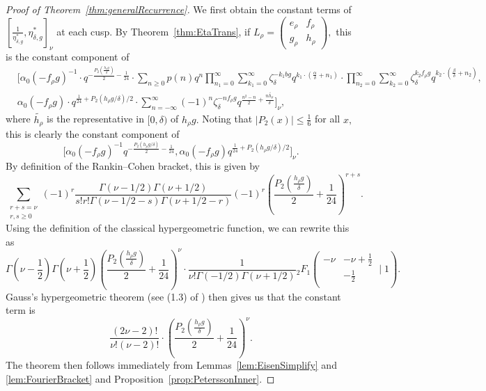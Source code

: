 \documentclass[10pt]{amsart}
\theoremstyle{definition}
\theoremstyle{remark}
\numberwithin{equation}{section}
\begin{document}
	\begin{proof}[Proof of Theorem~\ref{thm:generalRecurrence}]
		We first obtain the constant terms of $[\frac{1}{\eta_{\delta,g}^\ast},\eta_{\delta,g}^\ast]_\nu$ at each cusp. By Theorem~\ref{thm:EtaTrans}, if $L_\rho=\begin{pmatrix}
			e_\rho & f_\rho \\
			g_\rho & h_\rho
		\end{pmatrix},$ this is the constant component of
		\begin{align*}
			&\Bigg[\alpha_0(-f_\rho g)^{-1}\cdot q^{-\frac{P_2\left(\frac{h_\rho g}{\delta}\right)}{2}-\frac{1}{24}}\cdot\sum\limits_{n\geq 0}p(n)q^n\prod\limits_{n_1=0}^\infty\sum\limits_{k_1=0}^\infty\zeta_{\delta}^{-k_1bg}q^{k_1\cdot\left(\frac{\alpha}{\delta}+n_1\right)}\cdot \prod\limits_{n_2=0}^\infty\sum\limits_{k_2=0}^\infty\zeta_{\delta}^{k_2f_\rho g}q^{k_2\cdot\left(\frac{\beta}{\delta}+n_2\right)},\\ & \alpha_0(-f_\rho g)\cdot q^{\frac{1}{24}+P_2(h_\rho g/\delta)/2}\cdot\sum\limits_{n=-\infty}^{\infty} (-1)^n\zeta_\delta^{-nf_\rho g}q^{\frac{n^2-n}{2}+\frac{n\tilde{h_\rho}}{\delta}}\Bigg]_\nu,
		\end{align*} 
		where $\tilde{h_\rho}$ is the representative in $[0,\delta)$ of $h_\rho g.$ 
		Noting that $|P_2(x)|\leq\frac{1}{6}$ for all $x,$ this is clearly the constant component of
		$$
		\Bigg[\alpha_0(-f_\rho g)^{-1}q^{-\frac{P_2(h_\rho g/\delta)}{2}-\frac{1}{24}},\alpha_0(-f_\rho g)q^{\frac{1}{24}+P_2(h_\rho g/\delta)/2}\Bigg]_\nu.
		$$
		By definition of the Rankin--Cohen bracket, this is given by
			$$
		\sum\limits_{\substack{r+s=\nu \\ r,s\geq 0}}(-1)^r\frac{\Gamma(\nu-1/2)\Gamma(\nu+1/2)}{s!r!\Gamma(\nu-1/2-s)\Gamma(\nu+1/2-r)}(-1)^r \left(\frac{P_2\left(\frac{h_\rho g}{\delta}\right)}{2}+\frac{1}{24}\right)^{r+s}.
		$$
		Using the definition of the classical hypergeometric function, we can rewrite this as
	$$
	\Gamma(\nu-\frac{1}{2})\Gamma(\nu+\frac{1}{2})\left(\frac{P_2\left(\frac{h_\rho g}{\delta}\right)}{2}+\frac{1}{24}\right)^\nu\cdot \frac{1}{\nu!\Gamma(-1/2)\Gamma(\nu+1/2)}{_2F_1}\left(\begin{array}{cc}
		-\nu & -\nu+\frac{1}{2}\\
		~& -\frac{1}{2} \\
	\end{array}\mid 1\right).
	$$
	Gauss's hypergeometric theorem (see (1.3) of \cite{bailey}) then gives us that the constant term is
	$$
	\frac{(2\nu-2)!}{\nu!(\nu-2)!}\cdot\left(\frac{P_2\left(\frac{h_\rho g}{\delta}\right)}{2}+\frac{1}{24}\right)^\nu.
	$$
	The theorem then follows immediately from Lemmas~\ref{lem:EisenSimplify} and \ref{lem:FourierBracket} and Proposition~\ref{prop:PeterssonInner}.
	\end{proof}
	
\end{document}

